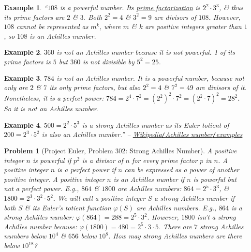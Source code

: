 \documentclass{article}
\newtheorem{example}{Example}
\newtheorem{problem}{Problem}
\begin{document}
\begin{example}
	``$108$ is a powerful number. Its \href{https://en.wikipedia.org/wiki/Prime_factorization}{prime factorization} is $2^2\cdot3^3$, \& thus its prime factors are $2$ \& $3$. Both $2^2 = 4$ \& $3^2 = 9$ are divisors of $108$. However, $108$ cannot be represented as $m^k$, where $m$ \& $k$ are positive integers greater than $1$, so $108$ is an Achilles number. 
\end{example}

\begin{example}
	$360$ is not an Achilles number because it is not powerful. 1 of its prime factors is $5$ but $360$ is not divisible by $5^2 = 25$.
\end{example}

\begin{example}
	$784$ is not an Achilles number. It is a powerful number, because not only are $2$ \& $7$ its only prime factors, but also $2^2 = 4$ \& $7^2 = 49$ are divisors of it. Nonetheless, it is a perfect power: $784 = 2^4\cdot7^2 = (2^2)^2\cdot7^2 = (2^2\cdot7)^2 = 28^2$. So it is not an Achilles number.
\end{example}

\begin{example}
	$500 = 2^2\cdot5^3$ is a strong Achilles number as its Euler totient of $200 = 2^3\cdot5^2$ is also an Achilles number.'' -- \href{https://en.wikipedia.org/wiki/Achilles_number#Examples}{Wikipedia\emph{{\tt/}}Achilles number\emph{{\tt/}}examples}
\end{example}

\begin{problem}[Project Euler, Problem 302: Strong Achilles Number]
	A positive integer $n$ is \emph{powerful} if $p^2$ is a divisor of $n$ for every prime factor $p$ in $n$. A positive integer $n$ is a \emph{perfect power} if $n$ can be expressed as a power of another positive integer. A positive integer $n$ is an \emph{Achilles number} if $n$ is powerful but not a perfect power. E.g., $864$ \& $1800$ are Achilles numbers: $864 = 2^5\cdot3^3$, \& $1800 = 2^3\cdot3^2\cdot5^2$. We will call a positive integer $S$ a \emph{strong Achilles number} if both $S$ \& its Euler's totient function $\varphi(S)$ are Achilles numbers. E.g., $864$ is a strong Achilles number: $\varphi(864) = 288 = 2^5\cdot3^2$. However, $1800$ isn't a strong Achilles number because: $\varphi(1800) = 480 = 2^5\cdot3\cdot5$. There are $7$ strong Achilles numbers below $10^4$ \& $656$ below $10^8$. How may strong Achilles numbers are there below $10^{18}$?
\end{problem}
\end{document}
